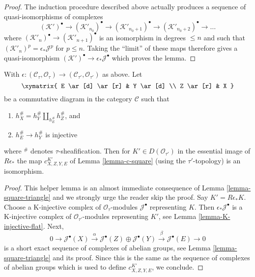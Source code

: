 \begin{proof}
\medskip\noindent
The induction procedure described above actually produces a sequence of
quasi-isomorphisms of complexes
$$
(\mathcal{K}')^\bullet \to
(\mathcal{K}'_{n_0})^\bullet \to
(\mathcal{K}'_{n_0 + 1})^\bullet \to
(\mathcal{K}'_{n_0 + 2})^\bullet \to \ldots
$$
where $(\mathcal{K}'_n)^\bullet \to (\mathcal{K}'_{n + 1})^\bullet$
is an isomorphism in degrees $\leq n$ and such that
$(\mathcal{K}'_n)^p = \epsilon_*\mathcal{J}^p$ for $p \leq n$.
Taking the ``limit'' of these maps therefore gives
a quasi-isomorphism $(\mathcal{K}')^\bullet \to \epsilon_*\mathcal{J}^\bullet$
which proves the lemma.
\end{proof}

\begin{lemma}
\label{lemma-descent-squares-helper}
With $\epsilon : (\mathcal{C}_\tau, \mathcal{O}_\tau) \to
(\mathcal{C}_{\tau'}, \mathcal{O}_{\tau'})$ as above. Let
$$
\xymatrix{
E \ar[d] \ar[r] & Y \ar[d] \\
Z \ar[r] & X
}
$$
be a commutative diagram in the category $\mathcal{C}$ such that
\begin{enumerate}
\item $h_X^\# = h_Y^\# \amalg_{h_E^\#} h_Z^\#$, and
\item $h_E^\# \to h_Y^\#$ is injective
\end{enumerate}
where ${}^\#$ denotes $\tau$-sheafification. Then for
$K' \in D(\mathcal{O}_{\tau'})$ in the essential image of
$R\epsilon_*$ the map $c^{K'}_{X, Z, Y, E}$ of Lemma \ref{lemma-c-square}
(using the $\tau'$-topology) is an isomorphism.
\end{lemma}

\begin{proof}
This helper lemma is an almost immediate consequence of
Lemma \ref{lemma-square-triangle}
and we strongly urge the reader skip the proof.
Say $K' = R\epsilon_*K$. Choose a K-injective complex of
$\mathcal{O}_\tau$-modules $\mathcal{J}^\bullet$ representing $K$.
Then $\epsilon_*\mathcal{J}^\bullet$ is a K-injective complex of
$\mathcal{O}_{\tau'}$-modules representing $K'$, see
Lemma \ref{lemma-K-injective-flat}. Next,
$$
0 \to
\mathcal{J}^\bullet(X) \xrightarrow{\alpha}
\mathcal{J}^\bullet(Z) \oplus
\mathcal{J}^\bullet(Y) \xrightarrow{\beta}
\mathcal{J}^\bullet(E)
\to 0
$$
is a short exact sequence of complexes of abelian groups, see
Lemma \ref{lemma-square-triangle} and its proof.
Since this is the same as the sequence of complexes of abelian
groups which is used to define $c^{K'}_{X, Z, Y, E}$, we conclude.
\end{proof}







